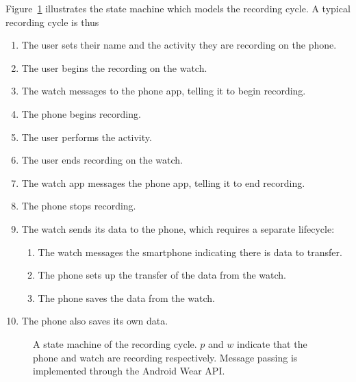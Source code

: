       Figure~\ref{fig:recordingstatemachine} illustrates the state machine which models the recording cycle. A typical recording cycle is thus
      \begin{enumerate}
        \item The user sets their name and the activity they are recording on the phone.
        \item The user begins the recording on the watch.
        \item The watch messages to the phone app, telling it to begin recording.
        \item The phone begins recording.
        \item The user performs the activity.
        \item The user ends recording on the watch.
        \item The watch app messages the phone app, telling it to end recording.
        \item The phone stops recording.
        \item The watch sends its data to the phone, which requires a separate lifecycle:
        \begin{enumerate}
          \item The watch messages the smartphone indicating there is data to transfer.
          \item The phone sets up the transfer of the data from the watch.
          \item The phone saves the data from the watch.
        \end{enumerate}
        \item The phone also saves its own data.
      \end{enumerate}
      
      \begin{figure}[!th]
        \centering
        \caption[A state machine of the recording cycle]{A state machine of the recording cycle. $p$ and $w$ indicate that the phone and watch are recording respectively. Message passing is implemented through the Android Wear API.}
        \label{fig:recordingstatemachine}
      \end{figure}
      
